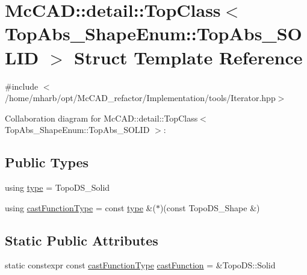 \hypertarget{structMcCAD_1_1detail_1_1TopClass_3_01TopAbs__ShapeEnum_1_1TopAbs__SOLID_01_4}{}\section{Mc\+C\+AD\+:\+:detail\+:\+:Top\+Class$<$ Top\+Abs\+\_\+\+Shape\+Enum\+:\+:Top\+Abs\+\_\+\+S\+O\+L\+ID $>$ Struct Template Reference}
\label{structMcCAD_1_1detail_1_1TopClass_3_01TopAbs__ShapeEnum_1_1TopAbs__SOLID_01_4}


{\ttfamily \#include $<$/home/mharb/opt/\+Mc\+C\+A\+D\+\_\+refactor/\+Implementation/tools/\+Iterator.\+hpp$>$}



Collaboration diagram for Mc\+C\+AD\+:\+:detail\+:\+:Top\+Class$<$ Top\+Abs\+\_\+\+Shape\+Enum\+:\+:Top\+Abs\+\_\+\+S\+O\+L\+ID $>$\+:
\subsection*{Public Types}
\begin{DoxyCompactItemize}
\item 
using \hyperlink{structMcCAD_1_1detail_1_1TopClass_3_01TopAbs__ShapeEnum_1_1TopAbs__SOLID_01_4_abfa1fdf68c51fe854dbd36332c8de9b5}{type} = Topo\+D\+S\+\_\+\+Solid
\item 
using \hyperlink{structMcCAD_1_1detail_1_1TopClass_3_01TopAbs__ShapeEnum_1_1TopAbs__SOLID_01_4_afc3cda33c10b3d00b02265c587b28931}{cast\+Function\+Type} = const \hyperlink{structMcCAD_1_1detail_1_1TopClass_3_01TopAbs__ShapeEnum_1_1TopAbs__SOLID_01_4_abfa1fdf68c51fe854dbd36332c8de9b5}{type} \&($\ast$)(const Topo\+D\+S\+\_\+\+Shape \&)
\end{DoxyCompactItemize}
\subsection*{Static Public Attributes}
\begin{DoxyCompactItemize}
\item 
static constexpr const \hyperlink{structMcCAD_1_1detail_1_1TopClass_3_01TopAbs__ShapeEnum_1_1TopAbs__SOLID_01_4_afc3cda33c10b3d00b02265c587b28931}{cast\+Function\+Type} \hyperlink{structMcCAD_1_1detail_1_1TopClass_3_01TopAbs__ShapeEnum_1_1TopAbs__SOLID_01_4_a5f396ee5b20a7331ed09a0ee362f6188}{cast\+Function} = \&Topo\+D\+S\+::\+Solid
\end{DoxyCompactItemize}


